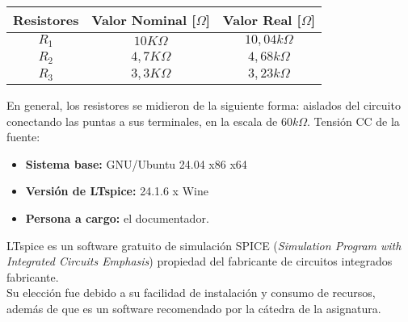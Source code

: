         \begin{center} 
            \begin{tabular}{| p{1cm}  p{1cm}  p{1cm} |} 
                \hline 
                \multicolumn{1}{|m{1.4cm}}{\centering\textbf{Resistores}} &
                \multicolumn{1}{m{1.4cm}}{\centering\textbf{Valor Nominal [$\Omega$]}} &
                \multicolumn{1}{m{1.4cm}|}{\centering\textbf{Valor Real [$\Omega$]}} \\
                \hline
                \multicolumn{1}{|c}{$R_1$} &
                \multicolumn{1}{c}{$10K\Omega$} &
                \multicolumn{1}{c|}{$10,04k\Omega$} \\
                \multicolumn{1}{|c}{$R_2$} &
                \multicolumn{1}{c}{$4,7K\Omega$} &
                \multicolumn{1}{c|}{$4,68k\Omega$} \\
                \multicolumn{1}{|c}{$R_3$} &
                \multicolumn{1}{c}{$3,3K\Omega$} &
                \multicolumn{1}{c|}{$3,23k\Omega$} \\
                \hline
            \end{tabular}
        \end{center}
        \sangria{} En general, los resistores se midieron de la siguiente forma: aislados del circuito conectando las puntas a sus terminales, en la escala de $60k\Omega$. 
        \sangria{} Tensión CC de la fuente:  \saltoPag{}
\begin{itemize} \item \textbf{Sistema base:} GNU/Ubuntu 24.04 x86 x64\item \textbf{Versión de LTspice:} 24.1.6 x Wine\item \textbf{Persona a cargo:} el documentador. \end{itemize}
\sangria{} LTspice es un software gratuito de simulación SPICE (\textit{Simulation Program with Integrated Circuits Emphasis}) propiedad del fabricante de circuitos integrados fabricante. \\ \sangria{} Su elección fue debido a su facilidad de instalación y consumo de recursos, además de que es un software recomendado por la cátedra de la asignatura.
 
 
\noindent
